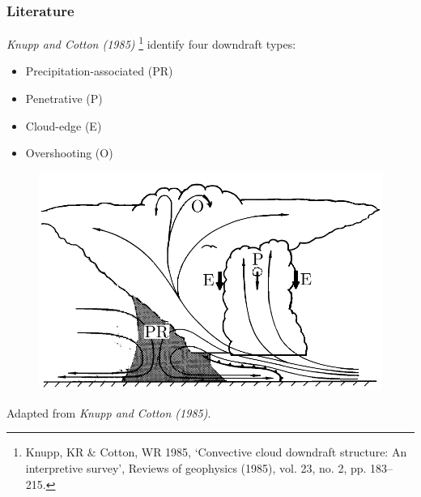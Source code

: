 \documentclass{beamer}
\begin{document}
\begin{frame}
    \frametitle{Literature}
    \emph{Knupp and Cotton (1985)}
    \footnote{ \tiny
        Knupp, KR \& Cotton, WR 1985, ‘Convective cloud downdraft
        structure: An interpretive survey’, Reviews of geophysics (1985),
        vol. 23, no. 2, pp. 183–215.}
    identify four downdraft types:
    \vspace{-2mm}
    \begin{multicols}{2}
        \small
        \begin{itemize}
            \item Precipitation-associated (PR)
            \item Penetrative (P)
            \item Cloud-edge (E)
            \item Overshooting (O)
        \end{itemize}
    \end{multicols}
    \vspace{-3mm}
    \begin{figure}[ht]
        \centering
        \includegraphics[width=0.6\linewidth]{figures/knupp_cotton_types.pdf}
    \end{figure}
    \vspace{-3mm}
    \centering \tiny Adapted from \emph{Knupp and Cotton (1985)}.

\end{frame}
\end{document}
